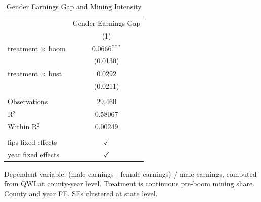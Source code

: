 
\begin{table}[htbp]
   \caption{\label{tab:gap} Gender Earnings Gap and Mining Intensity}
   \bigskip
   \centering
   \begin{tabular}{lc}
      \toprule
                               & Gender Earnings Gap \\   
                               & (1)\\  
      \midrule 
      treatment $\times$ boom  & 0.0666$^{***}$\\   
                               & (0.0130)\\   
      treatment $\times$ bust  & 0.0292\\   
                               & (0.0211)\\   
       \\
      Observations             & 29,460\\  
      R$^2$                    & 0.58067\\  
      Within R$^2$             & 0.00249\\  
       \\
      fips fixed effects       & $\checkmark$\\   
      year fixed effects       & $\checkmark$\\   
      \bottomrule
   \end{tabular}
   
   \par \raggedright 
   Dependent variable: (male earnings - female earnings) / male earnings, computed from QWI at county-year level. Treatment is continuous pre-boom mining share. County and year FE. SEs clustered at state level.
\end{table}


